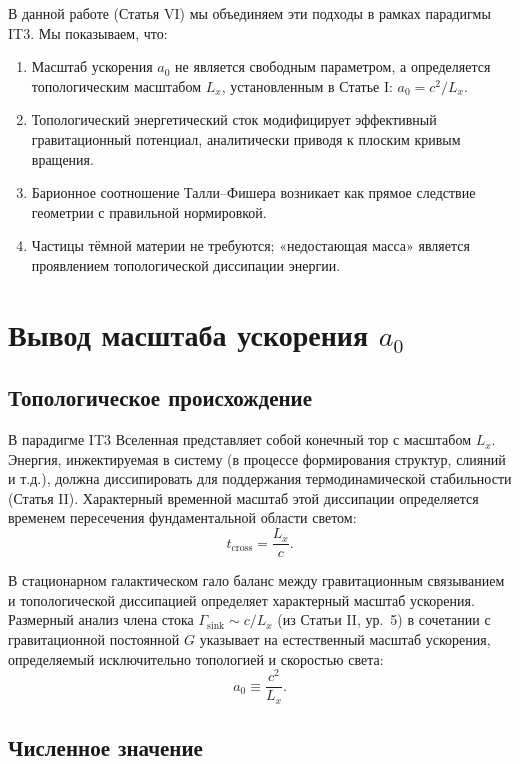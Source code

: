 \documentclass[12pt,a4paper]{article}
\begin{document}
В данной работе (Статья VI) мы объединяем эти подходы в рамках парадигмы IT3. Мы показываем, что:
\begin{enumerate}
    \item Масштаб ускорения $a_0$ не является свободным параметром, а определяется топологическим масштабом $L_x$, установленным в Статье I: $a_0 = c^2/L_x$.
    \item Топологический энергетический сток модифицирует эффективный гравитационный потенциал, аналитически приводя к плоским кривым вращения.
    \item Барионное соотношение Талли–Фишера возникает как прямое следствие геометрии с правильной нормировкой.
    \item Частицы тёмной материи не требуются; «недостающая масса» является проявлением топологической диссипации энергии.
\end{enumerate}

\section{Вывод масштаба ускорения $a_0$}

\subsection{Топологическое происхождение}

В парадигме IT3 Вселенная представляет собой конечный тор с масштабом $L_x$. Энергия, инжектируемая в систему (в процессе формирования структур, слияний и т.д.), должна диссипировать для поддержания термодинамической стабильности (Статья II). Характерный временной масштаб этой диссипации определяется временем пересечения фундаментальной области светом:
\begin{equation}
t_{\mathrm{cross}} = \frac{L_x}{c}.
\end{equation}

В стационарном галактическом гало баланс между гравитационным связыванием и топологической диссипацией определяет характерный масштаб ускорения. Размерный анализ члена стока $\Gamma_{\mathrm{sink}} \sim c/L_x$ (из Статьи II, ур.~5) в сочетании с гравитационной постоянной $G$ указывает на естественный масштаб ускорения, определяемый исключительно топологией и скоростью света:
\begin{equation}
a_0 \equiv \frac{c^2}{L_x}.
\label{eq:a0_def}
\end{equation}

\subsection{Численное значение}
\end{document}
